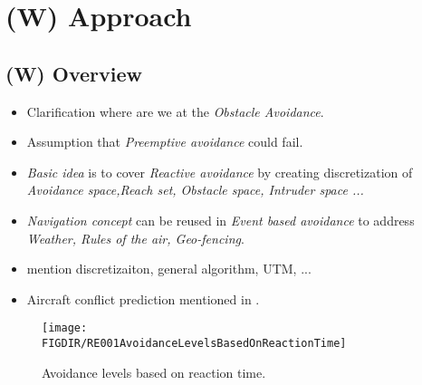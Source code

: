 \chapter{(W) Approach}\label{ch:approach}
\section{(W) Overview}\label{s:approachOverview}
    \begin{itemize}
        \item Clarification where are we at the \emph{Obstacle Avoidance}.
        \item Assumption that \emph{Preemptive avoidance} could fail.
        \item \emph{Basic idea} is to cover \emph{Reactive avoidance} by creating discretization of \emph{Avoidance space,Reach set, Obstacle space, Intruder space ...}
        \item \emph{Navigation concept} can be reused in \emph{Event based avoidance} to address \emph{Weather, Rules of the air, Geo-fencing}.
        \item mention discretizaiton, general algorithm, UTM, ...
        \item Aircraft conflict prediction mentioned in \cite{prandini2008application}.
    \end{itemize}
    \begin{figure}[H]
        \centering
        \texttt{[image: \\FIGDIR/RE001AvoidanceLevelsBasedOnReactionTime]} 
        \caption{Avoidance levels based on reaction time.}
        \label{fig:AvoidanceLevels}
    \end{figure}